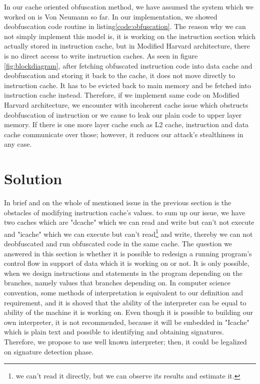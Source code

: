 	In our cache oriented obfuscation method, we have assumed the system which we worked on is Von Neumann so far. In our implementation, we showed deobfuscation code routine in listing\ref{code:obfuscation}. The reason why we can not simply implement this model is, it is working on the instruction section which actually stored in instruction cache, but in Modified Harvard architecture, there is no direct access to write instruction caches. As seen in figure \ref{fig:blockdiagram}, after fetching obfuscated instruction code into data cache and deobfuscation and storing it back to the cache, it does not move directly to instruction cache. It has to be evicted back to main memory and be fetched into instruction cache instead. Therefore, if we implement same code on Modified Harvard architecture, we encounter with incoherent cache issue which obstructs deobfuscation of instruction or we cause to leak our plain code to upper layer memory. If there is one more layer cache such as L2 cache, instruction and data cache communicate over those; however, it reduces our attack's stealthiness in any case.

\section{Solution}
	In brief and on the whole of mentioned issue in the previous section is the obstacles of modifying instruction cache's values. to sum up our issue, we have two caches which are "dcache" which we can read and write but can't not execute and "icache" which we can execute but can't read\footnote{we can't read it directly, but we can observe its results and estimate it.} and write, thereby we can not deobfuscated and run obfuscated code in the same cache. The question we answered in this section is whether it is possible to redesign a running program's control flow in support of data which it is working on or not. It is only possible, when we design instructions and  statements in the program depending on the branches, namely values that branches depending on. In computer science convention, some methods of interpretation is equivalent to our definition and requirement, and it is shoved that the ability of the interpreter can be equal to ability of the machine it is working on\cite{mak2011writing}\cite{abelson1996structure}. Even though it is possible to building our own interpreter, it is not recommended, because it will be embedded in "Icache" which is plain text and possible to identifying and obtaining signatures. Therefore, we propose to use well known interpreter; then, it could be legalized on signature detection phase.

